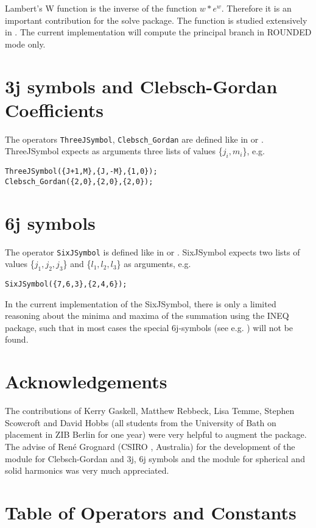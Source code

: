 Lambert's W function is the inverse of the function  $w*e^w$.
Therefore it is an important contribution for the solve package.
The function is studied extensively in \cite{Corless:92}.  
The current implementation will compute the principal branch in
ROUNDED mode only.

\section{3j symbols and Clebsch-Gordan Coefficients}
The operators {\tt ThreeJSymbol}, {\tt Clebsch\_Gordan} are defined like 
in \cite{Landolt:68} or \cite{Edmonds:57}. ThreeJSymbol expects as arguments
three lists of values \{$j_i,m_i$\}, e.g.

\begin{verbatim}
ThreeJSymbol({J+1,M},{J,-M},{1,0});
Clebsch_Gordan({2,0},{2,0},{2,0});
\end{verbatim}

\section{6j symbols }
The operator {\tt SixJSymbol} is defined like
in \cite{Landolt:68} or \cite{Edmonds:57}.
SixJSymbol expects two lists of values \{$j_1,j_2,j_3$\} and
 \{$l_1,l_2,l_3$\} as arguments, e.g.

\begin{verbatim}
SixJSymbol({7,6,3},{2,4,6});
\end{verbatim}

In the current implementation of the SixJSymbol, there is only a limited
reasoning about the minima and maxima of the summation using
the INEQ package, such that in most
cases the special 6j-symbols (see e.g. \cite{Landolt:68})
will not be found.



\section{Acknowledgements}

The contributions of Kerry Gaskell, Matthew Rebbeck, Lisa Temme,
Stephen Scowcroft and David Hobbs (all students from the University of Bath
on placement in ZIB Berlin for one year) were very helpful
to augment the package. The advise of Ren\'e Grognard (CSIRO , Australia)
for the development of the module for Clebsch-Gordan and 3j, 6j symbols
and the module for spherical and solid harmonics was very much appreciated.

\section{Table of Operators and Constants}

